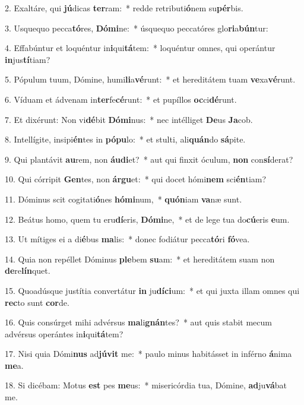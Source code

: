 2. Exaltáre, qui \textbf{jú}dicas \textbf{ter}ram:~*  redde retributi\textbf{ó}nem su\textbf{pér}bis.\

3. Usquequo pecca\textbf{tó}res, \textbf{Dó}\textbf{mi}ne:~*  úsquequo peccatóres glo\textbf{ri}a\textbf{bún}tur:\

4. Effabúntur et loquéntur in\textbf{i}qui\textbf{tá}tem:~*  loquéntur omnes, qui operántur \textbf{in}jus\textbf{tí}tiam?\

5. Pópulum tuum, Dómine, humi\textbf{li}a\textbf{vé}runt:~*  et hereditátem tuam \textbf{ve}xa\textbf{vé}runt.\

6. Víduam et ádvenam in\textbf{ter}fe\textbf{cé}runt:~*  et pupíllos \textbf{oc}ci\textbf{dé}runt.\

7. Et dixérunt: Non vi\textbf{dé}bit \textbf{Dó}\textbf{mi}nus:~*  nec intélliget \textbf{De}us \textbf{Ja}cob.\

8. Intellígite, insipi\textbf{én}tes in \textbf{pó}\textbf{pu}lo:~*  et stulti, ali\textbf{quán}do \textbf{sá}pite.\

9. Qui plantávit \textbf{au}rem, non \textbf{áu}\textbf{di}et?~*  aut qui finxit óculum, \textbf{non} con\textbf{sí}derat?\

10. Qui córripit \textbf{Gen}tes, non \textbf{ár}\textbf{gu}et:~*  qui docet hómi\textbf{nem} sci\textbf{én}tiam?\

11. Dóminus scit cogitati\textbf{ó}nes \textbf{hó}\textbf{mi}num,~*  \textbf{quón}iam \textbf{va}næ sunt.\

12. Beátus homo, quem tu eru\textbf{dí}eris, \textbf{Dó}\textbf{mi}ne,~*  et de lege tua do\textbf{cú}eris \textbf{e}um.\

13. Ut mítiges ei a di\textbf{é}bus \textbf{ma}lis:~*  donec fodiátur pecca\textbf{tó}ri \textbf{fó}vea.\

14. Quia non repéllet Dóminus \textbf{ple}bem \textbf{su}am:~*  et hereditátem suam non \textbf{de}re\textbf{lín}quet.\

15. Quoadúsque justítia convertátur \textbf{in} ju\textbf{dí}\textbf{ci}um:~*  et qui juxta illam omnes qui \textbf{rec}to sunt \textbf{cor}de.\

16. Quis consúrget mihi advérsus \textbf{ma}li\textbf{gnán}tes?~*  aut quis stabit mecum advérsus operántes in\textbf{i}qui\textbf{tá}tem?\

17. Nisi quia Dómi\textbf{nus} ad\textbf{jú}\textbf{vit} me:~*  paulo minus habitásset in inférno \textbf{á}nima \textbf{me}a.\

18. Si dicébam: Motus \textbf{est} pes \textbf{me}us:~*  misericórdia tua, Dómine, \textbf{ad}ju\textbf{vá}bat me.\

